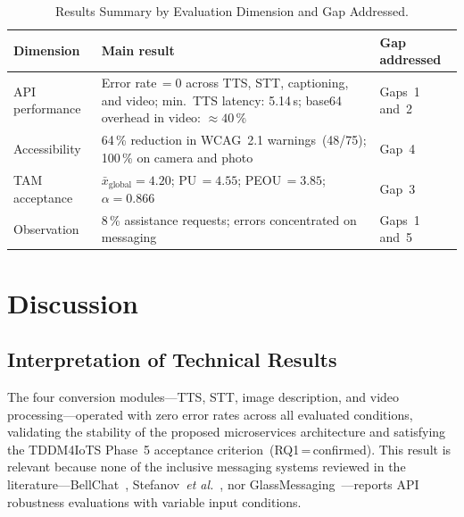 \documentclass[journal]{IEEEtran}
\begin{document}
	\begin{table}[!t]
		\caption{Results Summary by Evaluation Dimension and Gap Addressed.}
		\label{tab:sintesis}
		\centering
		\small
		\renewcommand{\arraystretch}{1.25}
		\begin{tabular}{p{2.0cm}p{2.8cm}p{2.5cm}}
			\toprule
			\textbf{Dimension} & \textbf{Main result} & \textbf{Gap addressed} \\
			\midrule
			API performance   & Error rate\,$=0$ across TTS, STT, captioning, and video; min.\ TTS latency: 5.14\,s; base64 overhead in video: ${\approx}40\,\%$ & Gaps~1 and~2 \\
			Accessibility    & 64\,\% reduction in WCAG~2.1 warnings~(48/75); 100\,\% on camera and photo & Gap~4 \\
			TAM acceptance   & $\bar{x}_{\text{global}}{=}4.20$; PU\,$=4.55$; PEOU\,$=3.85$; $\alpha{=}0.866$ & Gap~3 \\
			Observation      & 8\,\% assistance requests; errors concentrated on messaging & Gaps~1 and~5 \\
			\bottomrule
		\end{tabular}
	\end{table}
	
	\section{Discussion}
	\label{sec:discussion}
	
	\subsection{Interpretation of Technical Results}
	The four conversion modules---TTS, STT, image description, and
	video processing---operated with zero error rates across all
	evaluated conditions, validating the stability of the proposed
	microservices architecture and satisfying the TDDM4IoTS
	Phase~5 acceptance criterion~(RQ1\,=\,confirmed).
	This result is relevant because none of the inclusive messaging
	systems reviewed in the literature---BellChat~\cite{guerrero2021bellchat},
	Stefanov~\textit{et al.}~\cite{stefanov2024}, nor
	GlassMessaging~\cite{janaka2023}---reports API robustness
	evaluations with variable input conditions.
	
\end{document}
